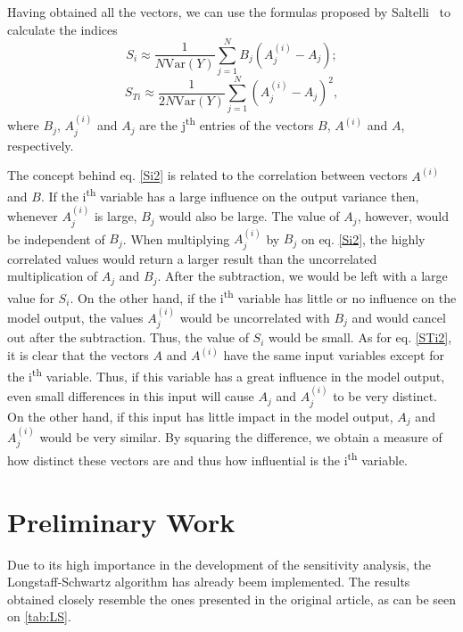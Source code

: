 \documentclass[a4paper,twocolumn,aps,prd,longbibliography,superscriptaddress]{revtex4-1}
\begin{document}
Having obtained all the vectors, we can use the formulas proposed by Saltelli~\cite{Saltelli2} to calculate the indices
\begin{equation}\label{Si2}
S_i\approx\frac{1}{N\mathrm{Var}(Y)}\sum_{j=1}^NB_j\left(A^{(i)}_j-A_j\right);
\end{equation}
\begin{equation}\label{STi2}
S_{Ti}\approx\frac{1}{2N\mathrm{Var}(Y)}\sum_{j=1}^N\left(A^{(i)}_j-A_j\right)^2,
\end{equation}
\noindent where $B_j$, $A^{(i)}_j$ and $A_j$ are the j\textsuperscript{th} entries of the vectors $B$, $A^{(i)}$ and $A$, respectively.


The concept behind eq. \eqref{Si2} is related to the correlation between vectors $A^{(i)}$ and $B$. If the i\textsuperscript{th} variable has a large influence on the output variance then, whenever $A^{(i)}_j$ is large, $B_j$ would also be large. The value of $A_j$, however, would be independent of $B_j$. When multiplying $A^{(i)}_j$ by $B_j$ on eq. \eqref{Si2}, the highly correlated values would return a larger result than the uncorrelated multiplication of $A_j$ and $B_j$. After the subtraction, we would be left with a large value for $S_i$.
On the other hand, if the i\textsuperscript{th} variable has little or no influence on the model output, the values $A^{(i)}_j$ would be uncorrelated with $B_j$ and would cancel out after the subtraction. Thus, the value of $S_i$ would be small.
As for eq. \eqref{STi2}, it is clear that the vectors $A$ and $A^{(i)}$ have the same input variables except for the i\textsuperscript{th} variable. Thus, if this variable has a great influence in the model output, even small differences in this input will cause $A_j$ and $A^{(i)}_j$ to be very distinct. On the other hand, if this input has little impact in the model output, $A_j$ and $A^{(i)}_j$ would be very similar.
By squaring the difference, we obtain a measure of how distinct these vectors are and thus how influential is the i\textsuperscript{th} variable.

\section{Preliminary Work}
Due to its high importance in the development of the sensitivity analysis, the Longstaff-Schwartz algorithm has already beem implemented. The results obtained closely resemble the ones presented in the original article\cite{Longstaff}, as can be seen on \autoref{tab:LS}.
\end{document}
